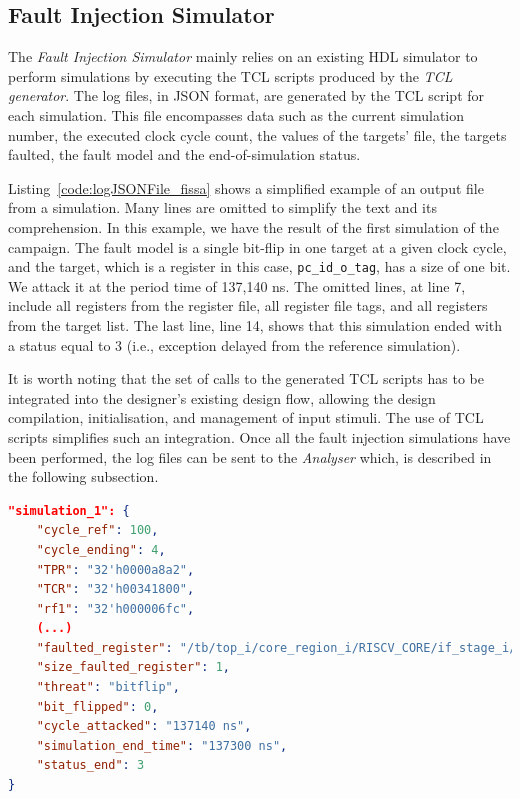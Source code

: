 \subsection{Fault Injection Simulator}
\label{subsec:FIS}

The \textit{Fault Injection Simulator} mainly relies on an existing HDL simulator to perform simulations by executing the TCL scripts produced by the \textit{TCL generator}. The log files, in JSON format, are generated by the TCL script for each simulation.
This file encompasses data such as the current simulation number, the executed clock cycle count, the values of the targets' file, the targets faulted, the fault model and the end-of-simulation status.

Listing~\ref{code:logJSONFile_fissa} shows a simplified example of an output file from a simulation. Many lines are omitted to simplify the text and its comprehension. In this example, we have the result of the first simulation of the campaign. The fault model is a single bit-flip in one target at a given clock cycle, and the target, which is a register in this case, \texttt{pc\_id\_o\_tag}, has a size of one bit. We attack it at the period time of 137,140 ns. The omitted lines, at line 7, include all registers from the register file, all register file tags, and all registers from the target list. The last line, line 14, shows that this simulation ended with a status equal to 3 (i.e., exception delayed from the reference simulation).

It is worth noting that the set of calls to the generated TCL scripts has to be integrated into the designer's existing design flow, allowing the design compilation, initialisation, and management of input stimuli. The use of TCL scripts simplifies such an integration. 
Once all the fault injection simulations have been performed, the log files can be sent to the \textit{Analyser} which, is described in the following subsection.

\begin{lstlisting}[style=topPosition, language=json, label=code:logJSONFile_fissa, caption=Extract of an example of a FISSA output log JSON file]
"simulation_1": {
    "cycle_ref": 100,
    "cycle_ending": 4,
    "TPR": "32'h0000a8a2",
    "TCR": "32'h00341800",
    "rf1": "32'h000006fc",
    (...)
    "faulted_register": "/tb/top_i/core_region_i/RISCV_CORE/if_stage_i/pc_id_o_tag",
    "size_faulted_register": 1,
    "threat": "bitflip",
    "bit_flipped": 0,
    "cycle_attacked": "137140 ns",
    "simulation_end_time": "137300 ns",
    "status_end": 3
}\end{lstlisting}

